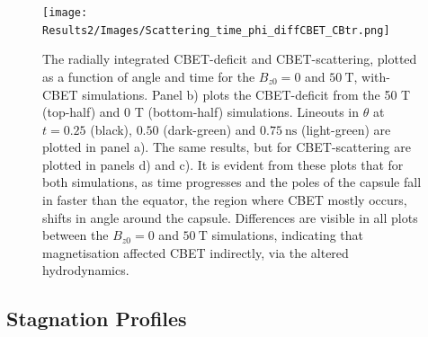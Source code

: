\begin{figure}[t!]
    \texttt{[image: Results2/Images/Scattering\_time\_phi\_diffCBET\_CBtr.png]}
    \centering
    \caption{The radially integrated \ac{CBET}-deficit and \ac{CBET}-scattering, plotted as a function of angle and time for the $B_{z0}=0$ and $50\ \text{T}$, with-\ac{CBET} simulations.
    Panel b) plots the \ac{CBET}-deficit from the 50 T (top-half) and 0 T (bottom-half) simulations.
    Lineouts in $\theta$ at $t=0.25$ (black), $0.50$ (dark-green) and $0.75\ \text{ns}$ (light-green) are plotted in panel a).
    The same results, but for \ac{CBET}-scattering are plotted in panels d) and c).
    It is evident from these plots that for both simulations, as time progresses and the poles of the capsule fall in faster than the equator, the region where \ac{CBET} mostly occurs, shifts in angle around the capsule.
    Differences are visible in all plots between the $B_{z0}=0$ and $50\ \text{T}$ simulations, indicating that magnetisation affected \ac{CBET} indirectly, via the altered hydrodynamics.}%
    \label{fig:Res2_scattering}
\end{figure}

\subsection{Stagnation Profiles}%
\label{sec:Res2_stgnation_profiles}


